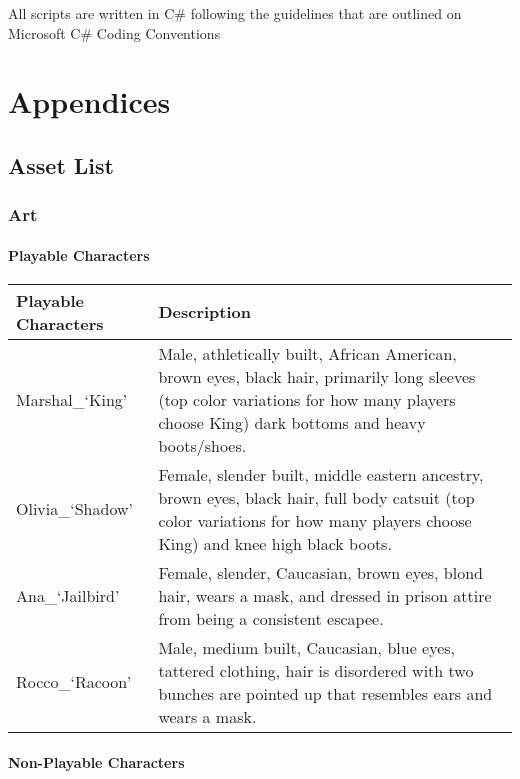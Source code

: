 \documentclass[10pt]{report}
\begin{document}
All scripts are written in C\# following the guidelines that are outlined on Microsoft C\# Coding Conventions


\chapter{Appendices}

\section{Asset List}

\subsection{Art}

\subsubsection{Playable Characters}

\begin{center}
    \begin{tabular}{| p{.45\linewidth} | p{.45\linewidth}|} 
        \hline
        Playable Characters & Description \\ \hline
        Marshal\_`King'  &   Male, athletically built, African American, brown eyes, black hair, primarily long sleeves (top color variations for how many players choose King) dark bottoms and heavy boots/shoes.  \\ \hline
        Olivia\_`Shadow' &   Female, slender built, middle eastern ancestry, brown eyes, black hair, full body catsuit (top color variations for how many players choose King) and knee high black boots.  \\ \hline
        Ana\_`Jailbird'  &   Female, slender, Caucasian, brown eyes, blond hair, wears a mask, and dressed in prison attire from being a consistent escapee.  \\ \hline
        Rocco\_`Racoon'  &   Male, medium built, Caucasian, blue eyes, tattered clothing, hair is disordered with two bunches are pointed up that resembles ears and wears a mask.  \\
        \hline
    \end{tabular}
\end{center}
    
\subsubsection{Non-Playable Characters}
\end{document}
